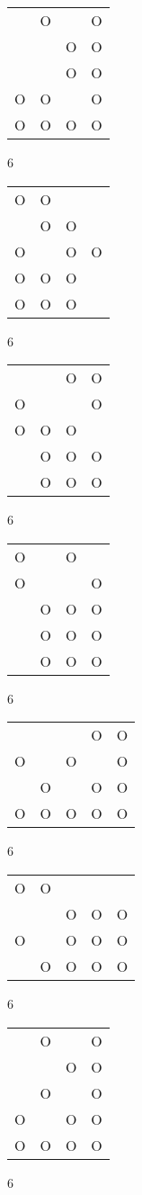 \begin{tabular}{|m{0.2cm}m{0.2cm}m{0.2cm}m{0.2cm}|}\hline
 &O& &O\\
 & &O&O\\
 & &O&O\\
O&O& &O\\
O&O&O&O\\
\hline\end{tabular}6
\begin{tabular}{|m{0.2cm}m{0.2cm}m{0.2cm}m{0.2cm}|}\hline
O&O& & \\
 &O&O& \\
O& &O&O\\
O&O&O& \\
O&O&O& \\
\hline\end{tabular}6
\begin{tabular}{|m{0.2cm}m{0.2cm}m{0.2cm}m{0.2cm}|}\hline
 & &O&O\\
O& & &O\\
O&O&O& \\
 &O&O&O\\
 &O&O&O\\
\hline\end{tabular}6
\begin{tabular}{|m{0.2cm}m{0.2cm}m{0.2cm}m{0.2cm}|}\hline
O& &O& \\
O& & &O\\
 &O&O&O\\
 &O&O&O\\
 &O&O&O\\
\hline\end{tabular}6
\begin{tabular}{|m{0.2cm}m{0.2cm}m{0.2cm}m{0.2cm}m{0.2cm}|}\hline
 & & &O&O\\
O& &O& &O\\
 &O& &O&O\\
O&O&O&O&O\\
\hline\end{tabular}6
\begin{tabular}{|m{0.2cm}m{0.2cm}m{0.2cm}m{0.2cm}m{0.2cm}|}\hline
O&O& & & \\
 & &O&O&O\\
O& &O&O&O\\
 &O&O&O&O\\
\hline\end{tabular}6
\begin{tabular}{|m{0.2cm}m{0.2cm}m{0.2cm}m{0.2cm}|}\hline
 &O& &O\\
 & &O&O\\
 &O& &O\\
O& &O&O\\
O&O&O&O\\
\hline\end{tabular}6
